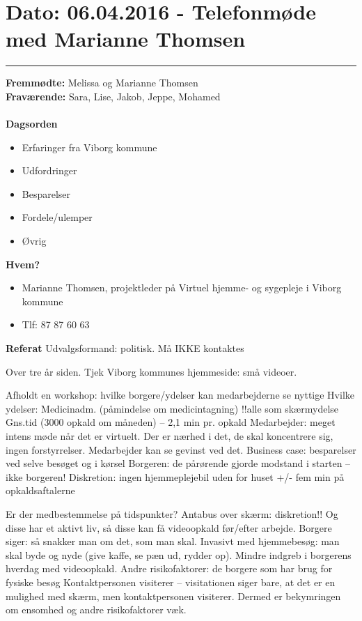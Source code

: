 \section{Dato: 06.04.2016 - Telefonmøde med Marianne Thomsen}
\hrule

\textbf{Fremmødte:} Melissa og Marianne Thomsen \\
\textbf{Fraværende:} Sara, Lise, Jakob, Jeppe, Mohamed 
\\
\\
\textbf{Dagsorden}
\begin{itemize}
	\item Erfaringer fra Viborg kommune 
	\item Udfordringer
	\item Besparelser
	\item Fordele/ulemper
	\item Øvrig
\end{itemize}

\textbf{Hvem?}
\begin{itemize}
	\item Marianne Thomsen, projektleder på Virtuel hjemme- og sygepleje i Viborg kommune
	\item Tlf: 87 87 60 63
\end{itemize}

\textbf{Referat}
Udvalgsformand: politisk. Må IKKE kontaktes

Over tre år siden. 
Tjek Viborg kommunes hjemmeside: små videoer.

Afholdt en workshop: hvilke borgere/ydelser kan medarbejderne se nyttige
Hvilke ydelser:
Medicinadm. (påmindelse om medicintagning) !!alle som skærmydelse 
Gns.tid (3000 opkald om måneden) – 2,1 min pr. opkald
Medarbejder: meget intens møde når det er virtuelt. Der er nærhed i det, de skal koncentrere sig, ingen forstyrrelser. Medarbejder kan se gevinst ved det.
Business case: besparelser ved selve besøget og i kørsel
Borgeren: de pårørende gjorde modstand i starten – ikke borgeren! 
Diskretion: ingen hjemmeplejebil uden for huset
+/- fem min på opkaldsaftalerne


Er der medbestemmelse på tidspunkter? 
Antabus over skærm: diskretion!! Og disse har et aktivt liv, så disse kan få videoopkald før/efter arbejde. 
Borgere siger: så snakker man om det, som man skal. 
Invasivt med hjemmebesøg: man skal byde og nyde (give kaffe, se pæn ud, rydder op). 
Mindre indgreb i borgerens hverdag med videoopkald. 
Andre risikofaktorer: de borgere som har brug for fysiske besøg
Kontaktpersonen visiterer – visitationen siger bare, at det er en mulighed med skærm, men kontaktpersonen visiterer. Dermed er bekymringen om ensomhed og andre risikofaktorer væk.

